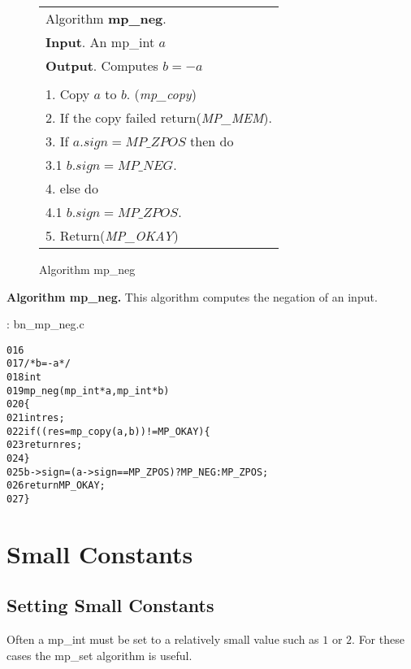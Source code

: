 \documentclass[b5paper]{book}
\begin{document}
\newpage\begin{figure}[here]
\begin{center}
\begin{tabular}{l}
\hline Algorithm \textbf{mp\_neg}. \\
\textbf{Input}.   An mp\_int $a$ \\
\textbf{Output}.  Computes $b = -a$ \\
\hline \\
1.  Copy $a$ to $b$.  (\textit{mp\_copy}) \\
2.  If the copy failed return(\textit{MP\_MEM}). \\
3.  If $a.sign = MP\_ZPOS$ then do \\
\hspace{3mm}3.1  $b.sign = MP\_NEG$. \\
4.  else do \\
\hspace{3mm}4.1  $b.sign = MP\_ZPOS$. \\
5.  Return(\textit{MP\_OKAY}) \\
\hline
\end{tabular}
\end{center}
\caption{Algorithm mp\_neg}
\end{figure}

\textbf{Algorithm mp\_neg.}
This algorithm computes the negation of an input.  

\vspace{+3mm}\begin{small}
\hspace{-5.1mm}{\bf File}: bn\_mp\_neg.c
\vspace{-3mm}
\begin{alltt}
016   
017   /* b = -a */
018   int
019   mp_neg (mp_int * a, mp_int * b)
020   \{
021     int     res;
022     if ((res = mp_copy (a, b)) != MP_OKAY) \{
023       return res;
024     \}
025     b->sign = (a->sign == MP_ZPOS) ? MP_NEG : MP_ZPOS;
026     return MP_OKAY;
027   \}
\end{alltt}
\end{small}

\section{Small Constants}
\subsection{Setting Small Constants}
Often a mp\_int must be set to a relatively small value such as $1$ or $2$.  For these cases the mp\_set algorithm is useful.
\end{document}
